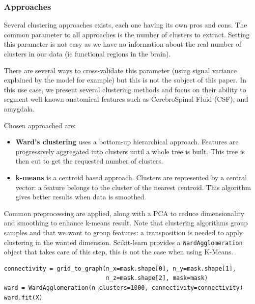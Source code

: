 \documentclass{frontiersSCNS} %
\begin{document}
\subsubsection{Approaches}

Several clustering approaches exists, each one having its own pros and cons.
The common parameter to all approaches is the number of clusters to extract.
Setting this parameter is not easy as we have no information about the real
number of clusters in our data (ie functional regions in the brain).

There are several ways to cross-validate this parameter (using signal variance
explained by the model for example) but this is not the subject of this paper.
In this use case, we present several clustering methods and focus on their
ability to segment well known anatomical features such as CerebroSpinal Fluid
(CSF), and amygdala.

Chosen approached are:
\begin{itemize}
    \item{\bf Ward's clustering} uses a bottom-up hierarchical approach. Features are
        progressively aggregated into clusters until a whole tree is built. This
        tree is then cut to get the requested number of clusters.
    \item{\bf k-means} is a centroid based approach. Clusters are represented by
        a central vector: a feature belongs to the cluster of the nearest
        centroid. This algorithm gives better results when data is smoothed.
\end{itemize}

Common preprocessing are applied, along with a PCA to reduce dimensionality and
smoothing to enhance k-means result. Note that clustering algorithms group
samples and that we want to group features: a transposition is needed to apply
clustering in the wanted dimension. Scikit-learn provides a
\texttt{WardAgglomeration} object that takes care of this step, this is not the
case when using K-Means.

\begin{lstlisting}
connectivity = grid_to_graph(n_x=mask.shape[0], n_y=mask.shape[1],
                             n_z=mask.shape[2], mask=mask)
ward = WardAgglomeration(n_clusters=1000, connectivity=connectivity)
ward.fit(X)
\end{lstlisting}
\end{document}
